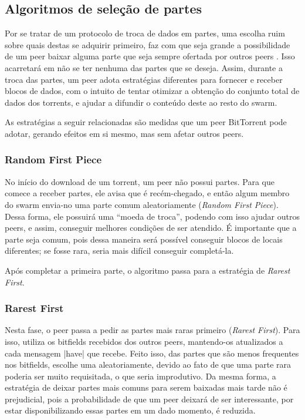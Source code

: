 
\newpage
\subsection*{Algoritmos de seleção de partes}

Por se tratar de um protocolo de troca de dados em partes, uma escolha ruim sobre quais
destas se adquirir primeiro, faz com que seja grande a possibilidade de um \gls*{peer}
baixar alguma parte que seja sempre ofertada por outros \glspl*{peer}
\cite{artigo:bittorrent}. Isso acarretará em não se ter nenhuma das partes que se
deseja. Assim, durante a troca das partes, um \gls*{peer} adota estratégias diferentes
para fornecer e receber blocos de dados, com o intuito de tentar otimizar a obtenção do
conjunto total de dados dos \glspl*{torrent}, e ajudar a difundir o conteúdo deste ao
resto do \gls*{swarm}.

As estratégias a seguir relacionadas são medidas que um \gls*{peer} BitTorrent pode
adotar, gerando efeitos em si mesmo, mas sem afetar outros \glspl*{peer}.

\subsubsection*{Random First Piece}

No início do download de um \gls*{torrent}, um \gls*{peer} não possui partes. Para que
comece a receber partes, ele avisa que é recém-chegado, e então algum membro do
\gls*{swarm} envia-no uma parte comum aleatoriamente (\emph{Random First Piece}). Dessa
forma, ele possuirá uma ``moeda de troca'', podendo com isso ajudar outros \glspl*{peer},
e assim, conseguir melhores condições de ser atendido. É importante que a parte seja
comum, pois dessa maneira será possível conseguir blocos de locais diferentes; se fosse
rara, seria mais difícil conseguir completá-la.

Após completar a primeira parte, o algoritmo passa para a estratégia de \emph{Rarest
First}.

\subsubsection*{Rarest First}
\label{subsubsec:rarest-first}

Nesta fase, o \gls*{peer} passa a pedir as partes mais raras primeiro
(\emph{Rarest First}). Para isso, utiliza os bitfields recebidos dos outros
\glspl*{peer}, mantendo-os atualizados a cada mensagem \bverb|have| que recebe. Feito
isso, das partes que são menos frequentes nos bitfields, escolhe uma aleatoriamente,
devido ao fato de que uma parte rara poderia ser muito requisitada, o que seria
improdutivo. Da mesma forma, a estratégia de deixar partes mais comuns para serem
baixadas mais tarde não é prejudicial, pois a probabilidade de que um \gls*{peer}
deixará de ser interessante, por estar disponibilizando essas partes em um dado
momento, é reduzida.


